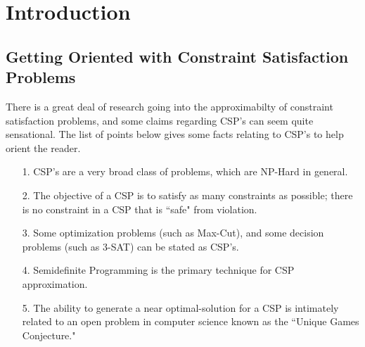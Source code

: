 \documentclass[12pt]{article}
\begin{document}
\section{Introduction}

\subsection{Getting Oriented with Constraint Satisfaction Problems}

There is a great deal of research going into the approximabilty of constraint satisfaction problems, and some claims regarding CSP's can seem quite sensational. 
The list of points below gives some facts relating to CSP's to help orient the reader.

\begin{itemize}
\item[1.] CSP's are a very broad class of problems, which are NP-Hard in general.
\item[2.] The objective of a CSP is to satisfy as many constraints as possible; there is no constraint in a CSP that is ``safe" from violation.
\item[3.] Some optimization problems (such as Max-Cut), and some decision problems (such as 3-SAT) can be stated as CSP's.
\item[4.] Semidefinite Programming is the primary technique for CSP approximation.
\item[5.] The ability to generate a near optimal-solution for a CSP is intimately related to an open problem in computer science known as the ``Unique Games Conjecture."
\end{itemize}
\end{document}
